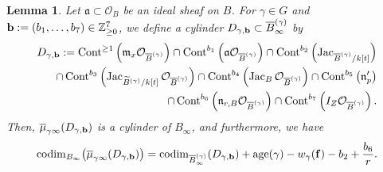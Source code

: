 \documentclass[a4paper,11pt]{amsart}
\newtheorem{lem}[thm]{Lemma}
\theoremstyle{definition}
\theoremstyle{remark}
\begin{document}
\begin{lem}\label{lem:D}
Let $\mathfrak{a} \subset \mathcal{O}_B$ be an ideal sheaf on $B$. 
For $\gamma \in G$ and ${\bf b} := (b_1, \ldots, b_7) \in \mathbb{Z}_{\ge 0} ^7$, 
we define a cylinder $D_{\gamma, {\bf b}} \subset \overline{B}^{(\gamma)}_{\infty}$ by
\begin{align*}
D_{\gamma, {\bf b}}
:= 
\operatorname{Cont}^{\ge 1} \left( \mathfrak{m}_x \mathcal{O}_{\overline{B}^{(\gamma)}} \right) 
\cap \operatorname{Cont}^{b_1} \left( \mathfrak{a}\mathcal{O}_{\overline{B}^{(\gamma)}} \right)
\cap \operatorname{Cont}^{b_2} \left( \operatorname{Jac}_{\overline{B}^{(\gamma)}/k[t]} \right) \\
\cap \operatorname{Cont}^{b_3} \left( \operatorname{Jac}_{\widetilde{B}^{(\gamma)}/k[t]} \mathcal{O}_{\overline{B}^{(\gamma)}} \right) 
\cap \operatorname{Cont}^{b_4}  \left( \operatorname{Jac}_{B} \mathcal{O}_{\overline{B}^{(\gamma)}} \right)
\cap \operatorname{Cont}^{b_5} \left( \mathfrak{n}'_{p} \right) \\
\cap \operatorname{Cont}^{b_6} \left( \mathfrak{n}_{r,B} \mathcal{O}_{\overline{B}^{(\gamma)}} \right)
\cap \operatorname{Cont}^{b_7} \left( I_Z \mathcal{O}_{\overline{B}^{(\gamma)}} \right).
\end{align*}
Then, $\overline{\mu} _{\gamma \infty} (D_{\gamma, {\bf b}})$ is a cylinder of $B_{\infty}$, and furthermore, we have 
\begin{align*}
\operatorname{codim}_{B_{\infty}} \bigl( \overline{\mu} _{\gamma \infty} (D_{\gamma, {\bf b}}) \bigr)
= 
\operatorname{codim} _{\overline{B}^{(\gamma)} _{\infty}} (D_{\gamma, {\bf b}})  
+ \operatorname{age}(\gamma) - w_{\gamma}({\bf f})  - b_2  + \frac{b_6}{r}. 
\end{align*}
\end{lem}
\end{document}
